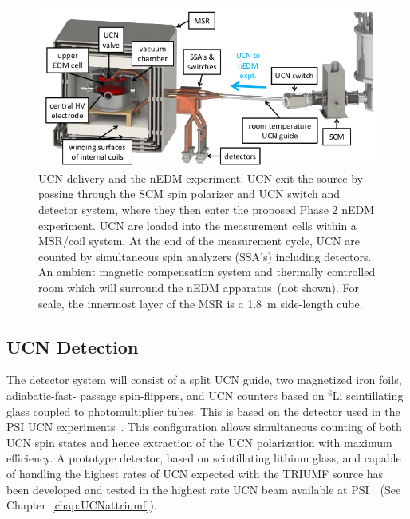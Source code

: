 \begin{figure}[h!]
  \centering
  \includegraphics[width=1.0\textwidth]{UCNdelivery.png}
  \caption{UCN delivery and the nEDM experiment. UCN exit the source
    by passing through the SCM spin polarizer and UCN switch and
    detector system, where they then enter the proposed Phase 2 nEDM
    experiment. UCN are loaded into the measurement cells within a
    MSR/coil system. At the end of the measurement cycle, UCN are
    counted by simultaneous spin analyzers (SSA’s) including
    detectors. An ambient magnetic compensation system and thermally
    controlled room which will surround the nEDM apparatus~(not
    shown). For scale, the innermost layer of the MSR is a 1.8~m
    side-length cube.}
  \label{fig:UCNdelivery}
\end{figure}

\subsection{UCN Detection}
The detector system will consist of a split UCN guide, two magnetized
iron foils, adiabatic-fast- passage spin-flippers, and UCN counters
based on $^6$Li scintillating glass coupled to photomultiplier
tubes. This is based on the detector used in the PSI UCN
experiments~\cite{Ban2009}. This configuration allows simultaneous
counting of both UCN spin states and hence extraction of the UCN
polarization with maximum efficiency. A prototype detector, based on
scintillating lithium glass, and capable of handling the highest rates
of UCN expected with the TRIUMF source has been developed and tested
in the highest rate UCN beam available at
PSI~\cite{jamieson2017characterization}~(See
Chapter~\ref{chap:UCNattriumf}).
  
